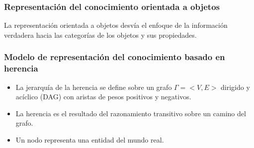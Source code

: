 \documentclass[
10pt, %
aspectratio=169, %
]{beamer}
\begin{document}
	\begin{frame}
		
		\frametitle{Representación del conocimiento orientada a objetos }
		
		La representación orientada a objetos desvía el enfoque de la información verdadera hacia las categorías de los objetos y sus propiedades.
		
	\end{frame}
	
	\begin{frame}
		
		\frametitle{Modelo de representación del conocimiento basado en herencia}
		
		\begin{itemize}
			\item La jerarquía de la herencia se define sobre un grafo $\Gamma = <V, E>$ dirigido y acíclico (DAG) con aristas de pesos positivos y negativos. 
			
			\vspace{1\baselineskip}
			\item La herencia es el resultado del razonamiento transitivo sobre un camino del grafo.
			
			\vspace{1\baselineskip}
			\item Un nodo representa una entidad del mundo real.
		\end{itemize}
		
	\end{frame}
	
\end{document}
